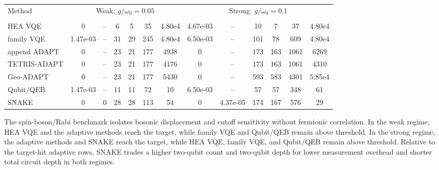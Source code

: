 \documentclass[
  reprint,
  amsmath,
  amssymb,
  aps,
  pra,
  nofootinbib,
  superscriptaddress,
  floatfix
]{revtex4-2}
\newcommand{\metrichead}[1]{\makebox[0.061\textwidth][c]{#1}}
\begin{document}
\begin{widetext}
\begin{minipage}{\textwidth}
\begin{center}
\begin{ruledtabular}
\begin{tabular}{p{}cccccc|cccccc}
\cline{2-13}
Method & \multicolumn{6}{c|}{Weak: $g/\omega_0=0.05$} & \multicolumn{6}{c}{Strong: $g/\omega_0=0.1$}\\
\cline{2-7}\cline{8-13}
 & \metrichead{$\delta E$} & \metrichead{$1-F$} & \metrichead{$N_{2q}$} & \metrichead{$D_{2q}$} & \metrichead{$D_c$} & \metrichead{$S$} & \metrichead{$\delta E$} & \metrichead{$1-F$} & \metrichead{$N_{2q}$} & \metrichead{$D_{2q}$} & \metrichead{$D_c$} & \metrichead{$S$}\\
\colrule
HEA VQE & 0 & -- & 6 & 5 & 35 & 4.80e4 & 4.67e-03 & -- & 10 & 7 & 37 & 4.80e4\\
family VQE & 1.47e-03 & -- & 31 & 29 & 245 & 4.80e4 & 6.50e-03 & -- & 101 & 78 & 609 & 4.80e4\\
append ADAPT & 0 & -- & 23 & 21 & 177 & 4938 & 0 & -- & 173 & 163 & 1061 & 6269\\
TETRIS-ADAPT & 0 & -- & 23 & 21 & 177 & 4176 & 0 & -- & 173 & 163 & 1061 & 4310\\
Geo-ADAPT & 0 & -- & 23 & 21 & 177 & 5430 & 0 & -- & 593 & 583 & 4301 & 5.85e4\\
Qubit/QEB & 1.47e-03 & -- & 11 & 11 & 72 & 10 & 6.50e-03 & -- & 57 & 57 & 348 & 61\\
SNAKE & 0 & 0 & 28 & 28 & 113 & 54 & 0 & 4.37e-05 & 174 & 167 & 576 & 29\\
\end{tabular}
\end{ruledtabular}
\end{center}
\end{minipage}
\par\addvspace{1.0ex}
The spin-boson/Rabi benchmark isolates bosonic displacement and cutoff sensitivity without fermionic correlation. In the weak regime, HEA VQE and the adaptive methods reach the target, while family VQE and Qubit/QEB remain above threshold. In the strong regime, the adaptive methods and SNAKE reach the target, while HEA VQE, family VQE, and Qubit/QEB remain above threshold. Relative to the target-hit adaptive rows, SNAKE trades a higher two-qubit count and two-qubit depth for lower measurement overhead and shorter total circuit depth in both regimes.


\end{widetext}
\end{document}
